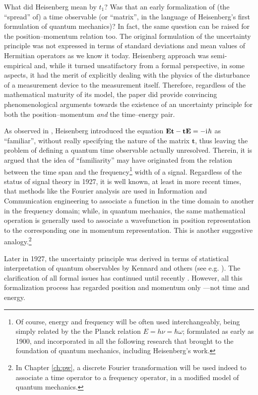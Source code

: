 What did Heisenberg mean by $t_1$? Was that an early formalization of (the ``spread'' of)
a time observable (or ``matrix'', in the language of Heisenberg's first formulation of quantum mechanics)?
In fact, the same question can be raised for the position--momentum
relation too. The original formulation of the uncertainty principle
was not expressed in terms of standard deviations and mean values of Hermitian operators
as we know it today. Heisenberg approach was semi-empirical and,
while it turned unsatifactory from a formal perspective, in some aspects,
it had the merit of explicitly dealing with the physics of the disturbance
of a measurement device to the measurement itself. Therefore,
regardless of the mathematical maturity of its model,
the paper did provide convincing phenomenological arguments towards
the existence of an uncertainty principle for both the position--momentum
\emph{and} the time--energy pair.

As observed in \cite[sec.1.1.3]{TQM1}, Heisenberg introduced the equation
$\mathbf{Et}-\mathbf{tE} = -\mathrm{i}\mkern1mu\hbar$
as ``familiar'', without really specifying the nature of the matrix $\mathbf{t}$,
thus leaving the problem of defining a quantum time observable actually unresolved.
Therein, it is argued that the idea of ``familiarity'' may have originated from the
relation between
the time span and the frequency\footnote{
  Of course, energy and frequency will be often used interchangeably,
  being
  simply related by the the Planck relation $E = h\nu = \hbar\omega$;
  formulated as early as 1900, and incorporated in all the following research
  that brought to the foundation of quantum mechanics, including Heisenberg's work.
}
width of a signal. Regardless of the status
of signal theory in 1927, it is well known, at least in more recent times, that
methods like the Fourier analysis are used in Information and Communication engineering to associate a function in the time domain
to another in the frequency domain; while, in quantum mechanics, the same mathematical operation
is generally used to associate a wavefunction in position representation to
the corresponding one in momentum representation.
This is another suggestive analogy.\footnote{
  In Chapter \ref{ch:pw}, a discrete Fourier transformation will be used indeed to
  associate a time operator to a frequency operator,
  in a modified model of quantum mechanics.
}

Later in 1927, the uncertainty principle was derived in terms of
statistical interpretation of quantum observables
by Kennard and others (see e.g. \cite{Kennard1927}).
The clarification of all formal issues has continued until recently \parencite{Appleby}.
However, all this formalization process has regarded position and momentum only
---not time and energy.

